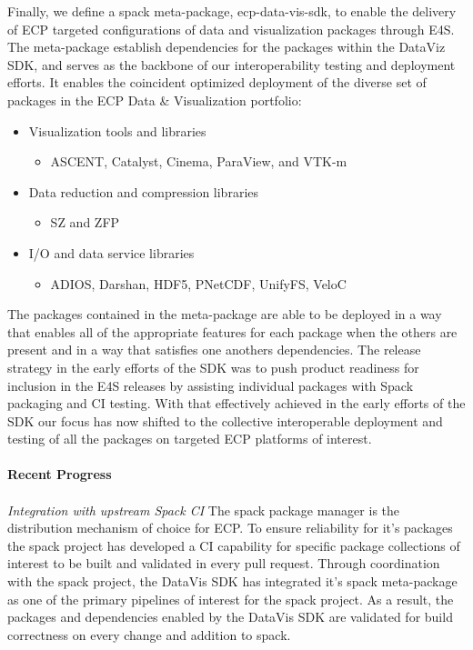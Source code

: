 Finally, we define a spack meta-package, ecp-data-vis-sdk, to enable the delivery of ECP targeted configurations of data and visualization packages through E4S.  The meta-package establish dependencies for the packages within the DataViz SDK, and serves as the backbone of our interoperability testing and deployment efforts. It enables the coincident optimized deployment of the diverse set of packages in the ECP Data \& Visualization portfolio:
\begin{itemize}
\item Visualization tools and libraries
  \begin{itemize}
  \item ASCENT, Catalyst, Cinema, ParaView, and VTK-m
  \end{itemize}
\item Data reduction and compression libraries
  \begin{itemize}
  \item SZ and ZFP
  \end{itemize}
\item I/O and data service libraries
  \begin{itemize}
  \item ADIOS, Darshan, HDF5, PNetCDF, UnifyFS, VeloC
  \end{itemize}
\end{itemize}

\noindent
The packages contained in the meta-package are able to be deployed in a way that enables all of the appropriate features for each package when the others are present and in a way that satisfies one anothers dependencies. The release strategy in the early efforts of the SDK was to push product readiness for inclusion in the E4S releases by assisting individual packages with Spack packaging and CI testing. With that effectively achieved in the early efforts of the SDK our focus has now shifted to the collective interoperable deployment and testing of all the packages on targeted ECP platforms of interest.

\paragraph{\textbf{Recent Progress}}
\paragraph{}


\textit{Integration with upstream Spack CI} The spack package manager is the distribution mechanism of choice for ECP.  To ensure reliability for it's packages the spack project has developed a CI capability for specific package collections of interest to be built and validated in every pull request.  Through coordination with the spack project, the DataVis SDK has integrated it's spack meta-package as one of the primary pipelines of interest for the spack project. As a result, the packages and dependencies enabled by the DataVis SDK are validated for build correctness on every change and addition to spack.

